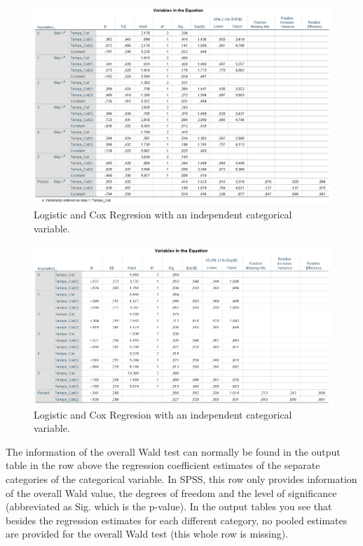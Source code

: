 \documentclass[]{book}
\theoremstyle{definition}
\theoremstyle{definition}
\theoremstyle{definition}
\theoremstyle{remark}
\begin{document}
\begin{figure}

{\centering \includegraphics[width=0.9\linewidth]{images/tab6.1a} 

}

\caption{Logistic and Cox Regresion with an independent categorical variable.}\label{fig:tab6-1a}
\end{figure}\begin{figure}

{\centering \includegraphics[width=0.9\linewidth]{images/tab6.1b} 

}

\caption{Logistic and Cox Regresion with an independent categorical variable.}\label{fig:tab6-1a}
\end{figure}

The information of the overall Wald test can normally be found in the
output table in the row above the regression coefficient estimates of
the separate categories of the categorical variable. In SPSS, this row
only provides information of the overall Wald value, the degrees of
freedom and the level of significance (abbreviated as Sig. which is the
p-value). In the output tables you see that besides the regression
estimates for each different category, no pooled estimates are provided
for the overall Wald test (this whole row is missing).
\end{document}
